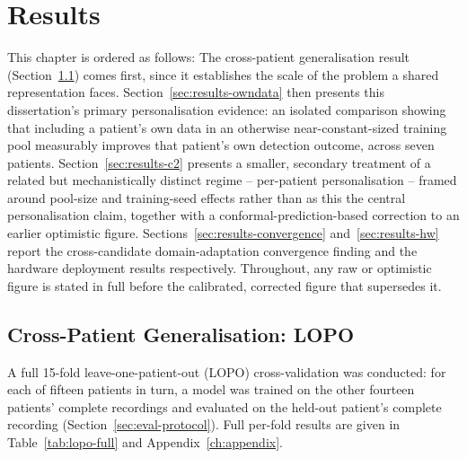 \chapter{Results}
\label{ch:results}

This chapter is ordered as follows: The cross-patient generalisation result (Section~\ref{sec:results-lopo}) comes first, since it establishes the scale of the problem a shared 
representation faces. Section~\ref{sec:results-owndata} then presents this dissertation's primary personalisation evidence: an isolated comparison showing that including a patient's 
own data in an otherwise near-constant-sized training pool measurably improves that patient's own detection outcome, across seven patients. Section~\ref{sec:results-c2} presents a 
smaller, secondary treatment of a related but mechanistically distinct regime -- per-patient personalisation -- framed around pool-size and training-seed effects rather than as this 
the central personalisation claim, together with a conformal-prediction-based correction to an earlier optimistic figure. Sections~\ref{sec:results-convergence} 
and~\ref{sec:results-hw} report the cross-candidate domain-adaptation convergence finding and the hardware deployment results respectively. Throughout, any raw or optimistic figure is 
stated in full before the calibrated, corrected figure that supersedes it.

\section{Cross-Patient Generalisation: LOPO}
\label{sec:results-lopo}

A full 15-fold leave-one-patient-out (LOPO) cross-validation was conducted: for each of fifteen patients in turn, a model was trained on the other fourteen patients' complete recordings and evaluated on the held-out patient's complete recording (Section~\ref{sec:eval-protocol}). Full per-fold results are given in Table~\ref{tab:lopo-full} and Appendix~\ref{ch:appendix}.

